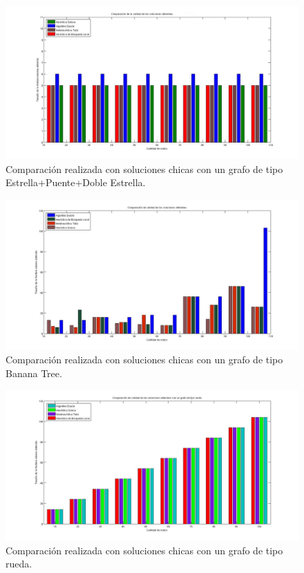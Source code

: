  \begin{figure}[H] %
\begin{center}
\includegraphics[width=400pt]{../imgs/calidadSolucionesChicas17.jpg}
\caption{Comparación realizada con soluciones chicas con un grafo de tipo Estrella+Puente+Doble Estrella.}
\end{center}
\end{figure}

 \begin{figure}[H] %
\begin{center}
\includegraphics[width=400pt]{../imgs/calidadSolucionesChicas3.jpg}
\caption{Comparación realizada con soluciones chicas con un grafo de tipo Banana Tree.}
\end{center}
\end{figure}

 \begin{figure}[H] %
\begin{center}
\includegraphics[width=400pt]{../imgs/calidadSolucionesChicas2.jpg}
\caption{Comparación realizada con soluciones chicas con un grafo de tipo rueda.}
\end{center}
\end{figure}

